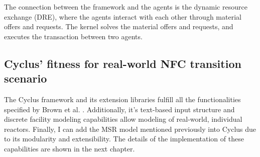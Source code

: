 The connection between the framework and the agents is
the dynamic resource exchange (DRE), where the agents
interact with each other through material offers and requests.
The kernel solves the material offers and requests, and executes
the transaction between two agents.

\subsection{Cyclus' fitness for real-world \gls{NFC} transition scenario}
The Cyclus framework and its extension libraries fulfill all the functionalities
specified by Brown et al. \cite{brown_identification_2016}.  Additionally,
it's text-based input structure and discrete facility modeling capabilities
allow modeling of real-world, individual reactors. Finally, I can add
the \gls{MSR} model mentioned previously into Cyclus due to its
modularity and extensibility. The details of the implementation
of these capabilities are shown in the next chapter.


